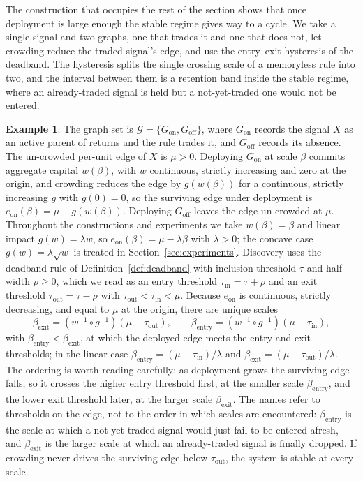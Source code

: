 \documentclass[11pt]{article}
\theoremstyle{plain}
\theoremstyle{definition}
\newtheorem{example}{Example}
\newcommand{\Gcal}{\mathcal{G}}
\begin{document}
The construction that occupies the rest of the section shows that once deployment is large enough the stable regime gives way to a cycle. We take a single signal and two graphs, one that trades it and one that does not, let crowding reduce the traded signal's edge, and use the entry--exit hysteresis of the deadband. The hysteresis splits the single crossing scale of a memoryless rule into two, and the interval between them is a retention band inside the stable regime, where an already-traded signal is held but a not-yet-traded one would not be entered.

\begin{example}\label{ex:cycle}
The graph set is $\Gcal=\{G_{\mathrm{on}},G_{\mathrm{off}}\}$, where $G_{\mathrm{on}}$ records the signal $X$ as an active parent of returns and the rule trades it, and $G_{\mathrm{off}}$ records its absence. The un-crowded per-unit edge of $X$ is $\mu>0$. Deploying $G_{\mathrm{on}}$ at scale $\beta$ commits aggregate capital $w(\beta)$, with $w$ continuous, strictly increasing and zero at the origin, and crowding reduces the edge by $g(w(\beta))$ for a continuous, strictly increasing $g$ with $g(0)=0$, so the surviving edge under deployment is $e_{\mathrm{on}}(\beta)=\mu-g(w(\beta))$. Deploying $G_{\mathrm{off}}$ leaves the edge un-crowded at $\mu$. Throughout the constructions and experiments we take $w(\beta)=\beta$ and linear impact $g(w)=\lambda w$, so $e_{\mathrm{on}}(\beta)=\mu-\lambda\beta$ with $\lambda>0$; the concave case $g(w)=\lambda\sqrt{w}$ is treated in Section~\ref{sec:experiments}. Discovery uses the deadband rule of Definition~\ref{def:deadband} with inclusion threshold $\tau$ and half-width $\rho\ge0$, which we read as an entry threshold $\tau_{\mathrm{in}}=\tau+\rho$ and an exit threshold $\tau_{\mathrm{out}}=\tau-\rho$ with $\tau_{\mathrm{out}}<\tau_{\mathrm{in}}<\mu$. Because $e_{\mathrm{on}}$ is continuous, strictly decreasing, and equal to $\mu$ at the origin, there are unique scales
\begin{equation}\label{eq:entryexit}
\beta_{\mathrm{exit}}=(w^{-1}\!\circ g^{-1})(\mu-\tau_{\mathrm{out}}),\qquad
\beta_{\mathrm{entry}}=(w^{-1}\!\circ g^{-1})(\mu-\tau_{\mathrm{in}}),
\end{equation}
with $\beta_{\mathrm{entry}}<\beta_{\mathrm{exit}}$, at which the deployed edge meets the entry and exit thresholds; in the linear case $\beta_{\mathrm{entry}}=(\mu-\tau_{\mathrm{in}})/\lambda$ and $\beta_{\mathrm{exit}}=(\mu-\tau_{\mathrm{out}})/\lambda$. The ordering is worth reading carefully: as deployment grows the surviving edge falls, so it crosses the higher entry threshold first, at the smaller scale $\beta_{\mathrm{entry}}$, and the lower exit threshold later, at the larger scale $\beta_{\mathrm{exit}}$. The names refer to thresholds on the edge, not to the order in which scales are encountered: $\beta_{\mathrm{entry}}$ is the scale at which a not-yet-traded signal would just fail to be entered afresh, and $\beta_{\mathrm{exit}}$ is the larger scale at which an already-traded signal is finally dropped. If crowding never drives the surviving edge below $\tau_{\mathrm{out}}$, the system is stable at every scale.
\end{example}
\end{document}
